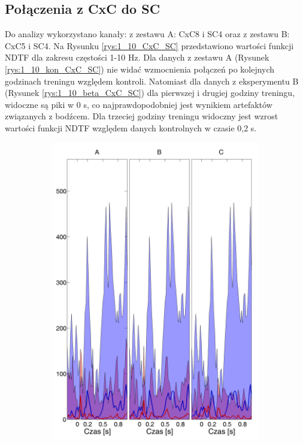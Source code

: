 \documentclass{pracamgr_2}
\begin{document}
	\subsection{Połączenia z CxC do SC}
	Do analizy wykorzystano kanały: z zestawu A: CxC8 i SC4 oraz z zestawu B: CxC5 i SC4.
	Na Rysunku \ref{rys:1_10_CxC_SC} przedstawiono wartości funkcji NDTF dla zakresu częstości 1-10 Hz. Dla danych z zestawu A (Rysunek \ref{rys:1_10_kon_CxC_SC}) nie widać wzmocnienia połączeń po kolejnych godzinach treningu względem kontroli. Natomiast dla danych z eksperymentu B (Rysunek \ref{rys:1_10_beta_CxC_SC}) dla pierwszej i drugiej godziny treningu, widoczne są piki w 0 s, co najprawdopodobniej jest wynikiem artefaktów związanych z bodźcem. Dla trzeciej godziny treningu widoczny jest wzrost wartości funkcji NDTF względem danych kontrolnych w czasie 0,2 s.
	\begin{figure}[h]
		\begin{subfigure}{.5\textwidth}
			\centering
			\includegraphics[width=1.\linewidth]{kontrola15_1-10_z_CxC8_do_SC42.png}

\end{subfigure}
\end{figure}
\end{document}
